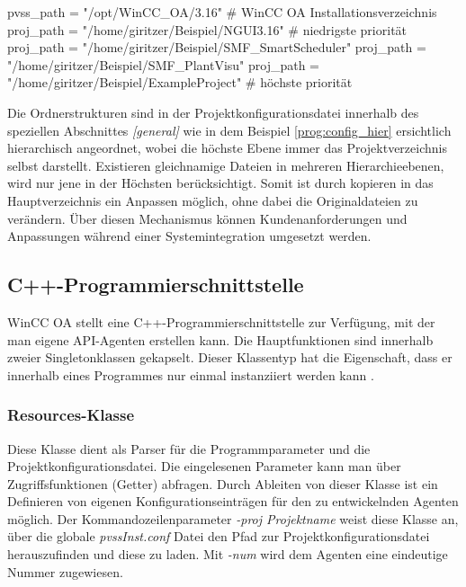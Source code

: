 \begin{program}[h]
	\caption{Beispiel für die Auflistung der Subprojekte innerhalb einer Konfigurationsdatei.}
	\label{prog:config_hier}
	\begin{GenericCode}
	[general]
	pvss_path = "/opt/WinCC_OA/3.16" # WinCC OA Installationsverzeichnis
	proj_path = "/home/giritzer/Beispiel/NGUI3.16" # niedrigste priorität
	proj_path = "/home/giritzer/Beispiel/SMF_SmartScheduler"
	proj_path = "/home/giritzer/Beispiel/SMF_PlantVisu"            
	proj_path = "/home/giritzer/Beispiel/ExampleProject" # höchste priorität\end{GenericCode}
\end{program}

Die Ordnerstrukturen sind in der Projektkonfigurationsdatei innerhalb des speziellen Abschnittes \textit{[general]} 
wie in dem Beispiel \ref{prog:config_hier} ersichtlich hierarchisch angeordnet, wobei die höchste Ebene immer das Projektverzeichnis selbst darstellt.
Existieren gleichnamige Dateien in mehreren Hierarchieebenen, wird nur jene in der Höchsten berücksichtigt. Somit ist 
durch kopieren in das Hauptverzeichnis ein Anpassen möglich, ohne dabei die Originaldateien zu verändern. 
Über diesen Mechanismus können Kundenanforderungen und Anpassungen während einer Systemintegration umgesetzt werden.


\subsection{C++-Programmierschnittstelle}

WinCC OA stellt eine C++-Programmierschnittstelle zur Verfügung, mit der man eigene API-Agenten erstellen kann. 
Die Hauptfunktionen sind innerhalb zweier Singletonklassen gekapselt. Dieser Klassentyp hat die Eigenschaft, dass
er innerhalb eines Programmes nur einmal instanziiert werden kann \cite{Singleton}.

\subsubsection{Resources-Klasse}

Diese Klasse dient als Parser für die Programmparameter und die Projektkonfigurationsdatei. Die eingelesenen Parameter kann man
über Zugriffsfunktionen (Getter) abfragen. Durch Ableiten von dieser Klasse ist ein Definieren von eigenen Konfigurationseinträgen
für den zu entwickelnden Agenten möglich. Der Kommandozeilenparameter \textit{-proj Projektname} weist diese Klasse an, über die globale 
\textit{pvssInst.conf} Datei den Pfad zur Projektkonfigurationsdatei herauszufinden und diese zu laden. Mit \textit{-num} wird
dem Agenten eine eindeutige Nummer zugewiesen.

